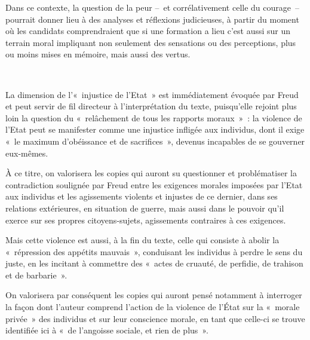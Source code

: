 {Dans ce contexte, la question de la peur –~et corrélativement celle du courage~– pourrait donner lieu à des analyses et réflexions judicieuses, à partir du moment où
les candidats comprendraient que si une formation a lieu c'est aussi sur un terrain
moral impliquant non seulement des sensations ou des perceptions, plus ou moins
mises en mémoire, mais aussi des vertus.}

\vfill{~}\clearpage

{La dimension de l'«~injustice de l'Etat~» est immédiatement évoquée par Freud et peut
servir de fil directeur à l'interprétation du texte, puisqu'elle rejoint plus loin la question
du «~relâchement de tous les rapports moraux~»~: la violence de l'Etat peut se
manifester comme une injustice infligée aux individus, dont il exige «~le maximum
d'obéissance et de sacrifices~», devenus incapables de se gouverner eux-mêmes.

À ce titre, on valorisera les copies qui auront su questionner et problématiser la
contradiction soulignée par Freud entre les exigences morales imposées par l'Etat aux
individus et les agissements violents et injustes de ce dernier, dans ses relations
extérieures, en situation de guerre, mais aussi dans le pouvoir qu'il exerce sur ses
propres citoyens-sujets, agissements contraires à ces exigences.

Mais cette violence est aussi, à la fin du texte, celle qui consiste à abolir la «~répression
des appétits mauvais~», conduisant les individus à perdre le sens du juste, en les
incitant à commettre des «~actes de cruauté, de perfidie, de trahison et de barbarie~».

On valorisera par conséquent les copies qui auront pensé notamment à interroger la
façon dont l'auteur comprend l'action de la violence de l'État sur la «~morale privée~»
des individus et sur leur conscience morale, en tant que celle-ci se trouve identifiée ici
à «~de l'angoisse sociale, et rien de plus~».}%
